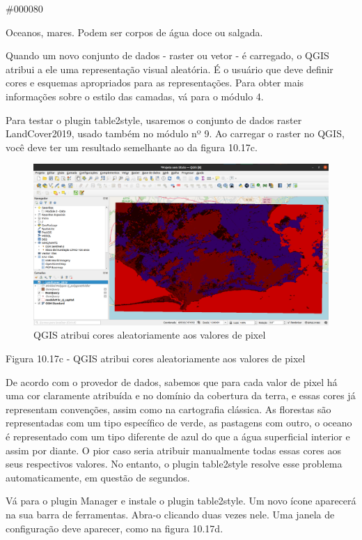 \documentclass[
]{krantz}
\begin{document}
\#000080

Oceanos, mares. Podem ser corpos de água doce ou salgada.

Quando um novo conjunto de dados - raster ou vetor - é carregado, o QGIS atribui a ele uma representação visual aleatória. É o usuário que deve definir cores e esquemas apropriados para as representações. Para obter mais informações sobre o estilo das camadas, vá para o módulo 4.

Para testar o plugin table2style, usaremos o conjunto de dados raster LandCover2019, usado também no módulo nº 9. Ao carregar o raster no QGIS, você deve ter um resultado semelhante ao da figura 10.17c.

\begin{figure}
\centering
\includegraphics{media/modulo10/fig1017_c.png}
\caption{QGIS atribui cores aleatoriamente aos valores de pixel}
\end{figure}

Figura 10.17c - QGIS atribui cores aleatoriamente aos valores de pixel

De acordo com o provedor de dados, sabemos que para cada valor de pixel há uma cor claramente atribuída e no domínio da cobertura da terra, e essas cores já representam convenções, assim como na cartografia clássica. As florestas são representadas com um tipo específico de verde, as pastagens com outro, o oceano é representado com um tipo diferente de azul do que a água superficial interior e assim por diante. O pior caso seria atribuir manualmente todas essas cores aos seus respectivos valores. No entanto, o plugin table2style resolve esse problema automaticamente, em questão de segundos.

Vá para o plugin Manager e instale o plugin table2style. Um novo ícone aparecerá na sua barra de ferramentas. Abra-o clicando duas vezes nele. Uma janela de configuração deve aparecer, como na figura 10.17d.
\end{document}
